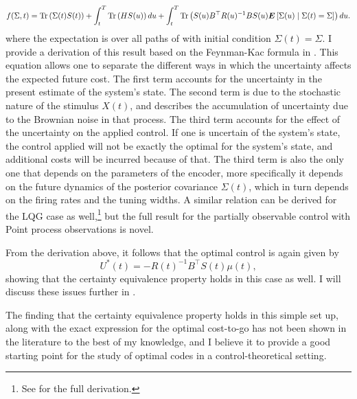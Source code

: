 \begin{equation}
\label{eq:poiss_cost}
f(\Sigma,t)  = \Tr\left(\Sigma(t) S(t)\right) + \int_t^T \Tr\left(H S(u)\right)du+ \int_t^T \Tr \left(S(u) B^\top R(u)^{-1}B S(u) \boldsymbol{E}\left[\Sigma(u)\mid \Sigma(t) = \Sigma \right]\right) du.
\end{equation}
where the expectation is over all paths of  with initial condition $\Sigma(t) = \Sigma$. I provide a derivation of this result based on the Feynman-Kac formula in
.
This equation allows one to separate the different ways in which the uncertainty affects the expected future cost. The first term accounts for the uncertainty in the present estimate
of the system's state. The second term is due to the stochastic nature of the stimulus $X(t)$, and describes the accumulation of uncertainty due to the Brownian noise in that process. 
The third term accounts for the effect of the uncertainty on the applied control. If one is uncertain of the system's state, the control applied will not be exactly the optimal for the system's 
state, and additional costs will be incurred because of that. The third term is also the only one that depends on the parameters of the encoder, more specifically it depends on the
future dynamics of the posterior covariance $\Sigma(t)$, which in turn depends on the firing rates and the tuning widths. A similar relation can be derived for the LQG case as 
well,\footnote{See \citep[p. 290]{astrom2006} for the full derivation.} but
the full result for the partially observable control with Point process observations is novel.
\par

From the derivation above, it follows that the optimal control is again given by
\[
U^*(t) = -R(t)^{-1} B^\top S(t) \mu(t),
\]
showing that the certainty equivalence property holds in this case as well. I will discuss these issues further in .\par
The finding that the certainty equivalence
property holds in this simple set up, along with the exact expression for the optimal cost-to-go has not been shown in the literature to the best of my knowledge, and I believe it to
provide a good starting point for the study of optimal codes in a control-theoretical setting.


